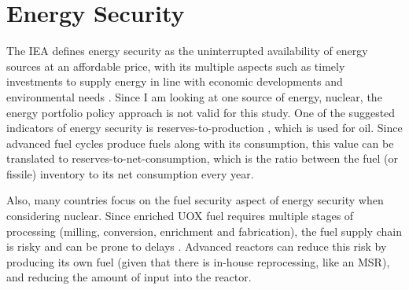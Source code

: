 \section{Energy Security}
The \gls{IEA} defines energy security as the uninterrupted
availability of energy sources at an affordable price, with
its multiple aspects such as timely investments to supply
energy in line with economic developments and environmental
needs \cite{lefevre-marton_energy_2005}. Since I am looking
at one source of energy, nuclear, the energy portfolio policy
approach \cite{winzer_conceptualizing_2012,
lefevre-marton_energy_2005} is not valid for this study.
One of the suggested indicators of energy security is reserves-to-production
\cite{feygin_oil_2004}, which is used for oil. Since advanced
fuel cycles produce fuels along with its consumption, this
value can be translated to reserves-to-net-consumption, which is
the ratio between the fuel (or fissile) inventory to its
net consumption every year.

Also, many countries focus on the fuel security aspect
of energy security when considering nuclear. Since enriched
\gls{UOX} fuel requires multiple stages of processing
(milling, conversion, enrichment and fabrication),
the fuel supply chain is risky and can be prone to delays
\cite{association_ensuring_2006}. Advanced reactors can
reduce this risk by producing its own fuel (given
that there is in-house reprocessing, like an \gls{MSR}),
and reducing the amount of input into the reactor.
